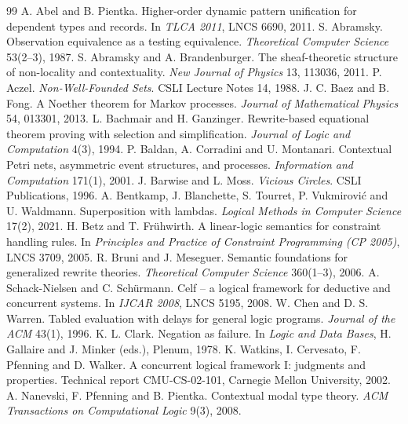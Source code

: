 \documentclass[11pt]{article}
\theoremstyle{remark}
\begin{document}
\begin{thebibliography}{99}
\small
{} A. Abel and B. Pientka. Higher-order dynamic pattern unification for dependent
  types and records. In \emph{TLCA 2011}, LNCS 6690, 2011.
 S. Abramsky. Observation equivalence as a testing equivalence. \emph{Theoretical
  Computer Science} 53(2--3), 1987.
 S. Abramsky and A. Brandenburger. The sheaf-theoretic structure of
  non-locality and contextuality. \emph{New Journal of Physics} 13, 113036, 2011.
 P. Aczel. \emph{Non-Well-Founded Sets}. CSLI Lecture Notes 14, 1988.
 J. C. Baez and B. Fong. A Noether theorem for Markov processes. \emph{Journal of
  Mathematical Physics} 54, 013301, 2013.
 L. Bachmair and H. Ganzinger. Rewrite-based equational theorem proving with
  selection and simplification. \emph{Journal of Logic and Computation} 4(3), 1994.
 P. Baldan, A. Corradini and U. Montanari. Contextual Petri nets,
  asymmetric event structures, and processes. \emph{Information and Computation} 171(1), 2001.
 J. Barwise and L. Moss. \emph{Vicious Circles}. CSLI Publications, 1996.
 A. Bentkamp, J. Blanchette, S. Tourret, P. Vukmirovi\'c and U. Waldmann. Superposition
  with lambdas. \emph{Logical Methods in Computer Science} 17(2), 2021.
 H. Betz and T. Fr\"uhwirth. A linear-logic semantics for constraint handling
  rules. In \emph{Principles and Practice of Constraint Programming (CP 2005)}, LNCS 3709, 2005.
 R. Bruni and J. Meseguer. Semantic foundations for generalized rewrite theories.
  \emph{Theoretical Computer Science} 360(1--3), 2006.
 A. Schack-Nielsen and C. Sch\"urmann. Celf -- a logical framework for deductive and
  concurrent systems. In \emph{IJCAR 2008}, LNCS 5195, 2008.
 W. Chen and D. S. Warren. Tabled evaluation with delays for general logic programs.
  \emph{Journal of the ACM} 43(1), 1996.
 K. L. Clark. Negation as failure. In \emph{Logic and Data Bases}, H. Gallaire and J.
  Minker (eds.), Plenum, 1978.
 K. Watkins, I. Cervesato, F. Pfenning and D. Walker. A concurrent logical framework I:
  judgments and properties. Technical report CMU-CS-02-101, Carnegie Mellon University, 2002.
 A. Nanevski, F. Pfenning and B. Pientka. Contextual modal type theory. \emph{ACM
  Transactions on Computational Logic} 9(3), 2008.

\end{thebibliography}
\end{document}
